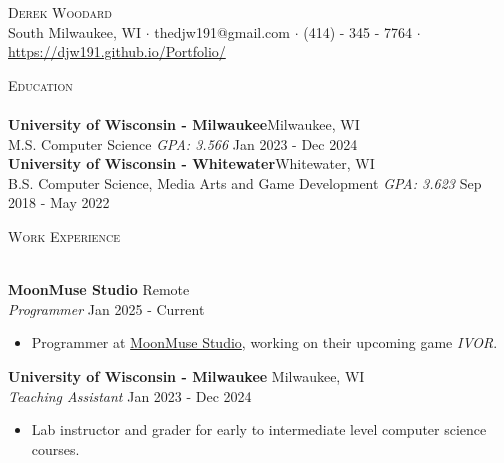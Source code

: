 \documentclass[letter, 12pt]{article}
\newcommand{\lineunder} {
    \vspace*{-8pt} \\
    \hspace*{-18pt} \hrulefill \\
}
\newcommand{\header} [1] {
    {\hspace*{-18pt}\vspace*{6pt} \textsc{#1}}
    \vspace*{-6pt} \lineunder
}
\begin{document}
\vspace*{-40pt}

    

\vspace*{-10pt}
\begin{center}
	{\Huge \scshape {Derek Woodard}}\\
	\vspace{5mm}	
	South Milwaukee, WI $\cdot$ thedjw191@gmail.com $\cdot$ (414) - 345 - 7764 $\cdot$ \url{https://djw191.github.io/Portfolio/}\\
\end{center}

\header{Education}
\textbf{University of Wisconsin - Milwaukee}\hfill Milwaukee, WI\\
M.S. Computer Science \textit{GPA: 3.566} \hfill Jan 2023 - Dec 2024\\
\vspace{2mm}
\textbf{University of Wisconsin - Whitewater}\hfill Whitewater, WI\\
B.S. Computer Science, Media Arts and Game Development \textit{GPA: 3.623} \hfill Sep 2018 - May 2022\\
\vspace{2mm}

\header{Work Experience}
\vspace{1mm}

\textbf{MoonMuse Studio} \hfill Remote\\
\textit{Programmer} \hfill Jan 2025 - Current\\
\vspace{-1mm}
\begin{itemize} \itemsep 1pt
	\item Programmer at \href{https://www.moonmuse-studio.com/}{MoonMuse Studio}, working on their upcoming game \textit{IVOR}.
\end{itemize}

\textbf{University of Wisconsin - Milwaukee} \hfill Milwaukee, WI\\
\textit{Teaching Assistant} \hfill Jan 2023 - Dec 2024\\
\vspace{-1mm}
\begin{itemize} \itemsep 1pt
	\item Lab instructor and grader for early to intermediate level computer science courses.
\end{itemize}
\end{document}
